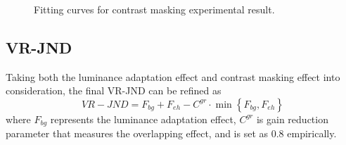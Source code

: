 \documentclass[journal]{IEEEtran}
\begin{document}
\begin{figure}[!t]
	\caption{Fitting curves for contrast masking experimental result.}
	\label{fig:curve_fitting_eh}
\end{figure}
\subsection{VR-JND}
Taking both the luminance adaptation effect and contrast masking effect into consideration, the final VR-JND can be refined as
\begin{equation}
VR-JND= F_{bg}+F_{eh}-C^{gr}\cdot \min \left\{F_{bg}, F_{eh}\right\}
\end{equation}
where $F_{bg}$ represents the luminance adaptation effect, $C^{gr}$ is gain reduction parameter that measures the overlapping effect, and is set as $0.8$ empirically.
\end{document}
